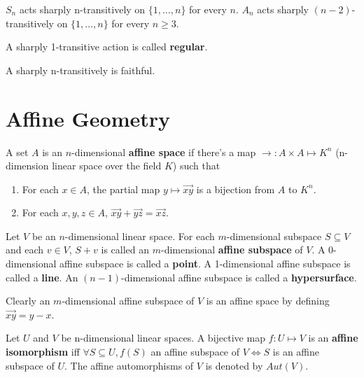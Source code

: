 \documentclass[12pt]{book}
\begin{document}
\begin{lemma}
	$S_n$ acts sharply n-transitively on $\{1,\dots,n\}$ for every $n$. $A_n$ acts sharply $(n-2)$-transitively on $\{1,\dots,n\}$ for every $n\geq 3$.
\end{lemma}

\begin{definition}
	A sharply 1-transitive action is called {\bf regular}.
\end{definition}

\begin{lemma}
	A sharply n-transitively is faithful.
\end{lemma}


\section{Affine Geometry}

\begin{definition}
	A set $A$ is an $n$-dimensional {\bf affine space} if there's a map $\rightarrow:A\times A\mapsto K^n$ (n-dimension linear space over the field $K$) such that 
	\begin{enumerate}
		\item For each $x\in A$, the partial map $y\mapsto\overrightarrow{xy}$ is a bijection from $A$ to $ K^n$.
		\item For each $x,y,z\in A$, $\overrightarrow{xy}+\overrightarrow{yz}=\overrightarrow{xz}$.
	\end{enumerate}
\end{definition}

\begin{definition}
	Let $V$ be an $n$-dimensional linear space. For each $m$-dimensional subspace $S\subseteq V$ and each $v\in V$, $S+v$ is called an $m$-dimensional {\bf affine subspace} of $V$. A 0-dimensional affine subspace is called a {\bf point}. A 1-dimensional affine subspace is called a {\bf line}. An $(n-1)$-dimensional affine subspace is called a {\bf hypersurface}.
\end{definition}
Clearly an $m$-dimensional affine subspace of $V$ is an affine space by defining $\overrightarrow{xy}=y-x$.

\begin{definition}
	Let $U$ and $V$ be n-dimensional linear spaces. A bijective map $f:U\mapsto V$ is an {\bf affine isomorphism} iff $\forall S\subseteq U,f(S)$ an affine subspace of $V\Leftrightarrow S$ is an affine subspace of $U$. The affine automorphisms of $V$ is denoted by $Aut(V)$.
\end{definition}
\end{document}
